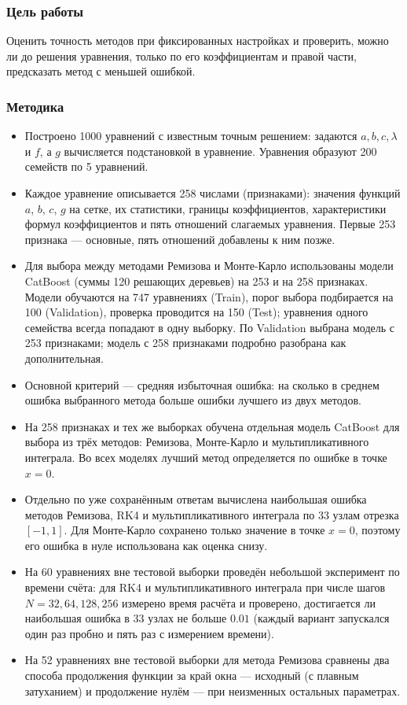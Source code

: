 \documentclass[14pt,a4paper]{extarticle}
\begin{document}
\subsubsection*{Цель работы}
Оценить точность методов при фиксированных настройках и проверить,
можно ли до решения уравнения, только по его коэффициентам и правой
части, предсказать метод с меньшей ошибкой.

\subsubsection*{Методика}
\begin{itemize}
\item Построено 1000 уравнений с известным точным решением: задаются
$a,b,c,\lambda$ и $f$, а $g$ вычисляется подстановкой в уравнение.
Уравнения образуют 200 семейств по 5 уравнений.
\item Каждое уравнение описывается 258 числами (признаками): значения
функций $a$, $b$, $c$, $g$ на сетке, их статистики, границы
коэффициентов, характеристики формул коэффициентов и пять отношений
слагаемых уравнения. Первые 253 признака --- основные, пять отношений
добавлены к ним позже.
\item Для выбора между методами Ремизова и Монте-Карло использованы
модели CatBoost (суммы 120 решающих деревьев) на 253 и на 258
признаках. Модели обучаются на 747 уравнениях (Train), порог выбора
подбирается на 100 (Validation), проверка проводится на 150 (Test);
уравнения одного семейства всегда попадают в одну выборку.
По Validation выбрана модель с 253 признаками; модель с 258 признаками
подробно разобрана как дополнительная.
\item Основной критерий --- средняя избыточная ошибка: на сколько
в среднем ошибка выбранного метода больше ошибки лучшего из двух методов.
\item На 258 признаках и тех же выборках обучена отдельная модель
CatBoost для выбора из трёх методов: Ремизова, Монте-Карло
и мультипликативного интеграла. Во всех моделях лучший метод
определяется по ошибке в точке $x=0$.
\item Отдельно по уже сохранённым ответам вычислена наибольшая ошибка
методов Ремизова, RK4 и мультипликативного интеграла по 33 узлам
отрезка $[-1,1]$. Для Монте-Карло сохранено только значение в точке
$x=0$, поэтому его ошибка в нуле использована как оценка снизу.
\item На 60 уравнениях вне тестовой выборки проведён небольшой
эксперимент по времени счёта: для RK4 и мультипликативного интеграла
при числе шагов $N=32,64,128,256$ измерено время расчёта и проверено,
достигается ли наибольшая ошибка в 33 узлах не больше $0.01$ (каждый
вариант запускался один раз пробно и пять раз с измерением времени).
\item На 52 уравнениях вне тестовой выборки для метода Ремизова
сравнены два способа продолжения функции за край окна --- исходный
(с плавным затуханием) и продолжение нулём --- при неизменных
остальных параметрах.
\end{itemize}
\end{document}
